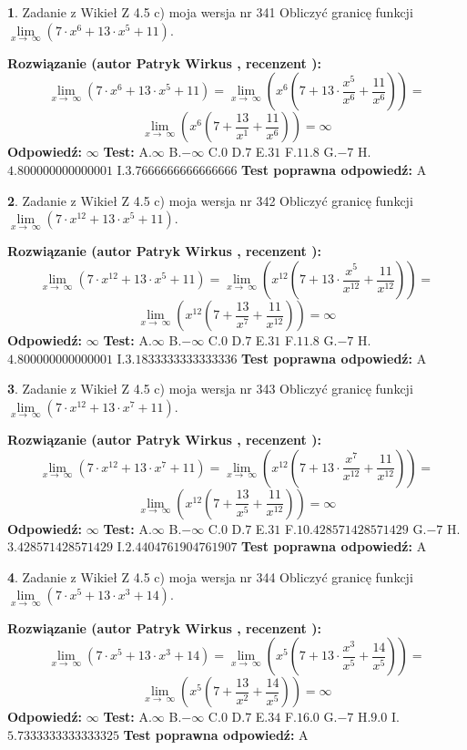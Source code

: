 \documentclass[12pt, a4paper]{article}
\theoremstyle{definition} %
\newtheorem{zad}{}
\newcommand{\zadStart}[1]{\begin{zad}#1\newline}
\newcommand{\zadStop}{\end{zad}}
\newcommand{\rozwStart}[2]{\noindent \textbf{Rozwiązanie (autor #1 , recenzent #2): }\newline}
\newcommand{\rozwStop}{\newline}
\newcommand{\odpStart}{\noindent \textbf{Odpowiedź:}\newline}
\newcommand{\odpStop}{\newline}
\newcommand{\testStart}{\noindent \textbf{Test:}\newline}
\newcommand{\testStop}{\newline}
\newcommand{\kluczStart}{\noindent \textbf{Test poprawna odpowiedź:}\newline}
\newcommand{\kluczStop}{\newline}
\begin{document}
\zadStart{Zadanie z Wikieł Z 4.5 c) moja wersja nr 341}
Obliczyć granicę funkcji  $\lim\limits_{x\to\ \infty}(7 \cdot x^{6}+13 \cdot x^{5}+11)$.
\zadStop
\rozwStart{Patryk Wirkus}{}
$$\lim\limits_{x\to\ \infty}(7 \cdot x^{6}+13 \cdot x^{5}+11) = \lim\limits_{x\to\ \infty}(x^{6}(7 +13 \cdot \frac{x^{5}}{x^{6}}+\frac{11}{x^{6}})) =$$ $$\lim\limits_{x\to\ \infty}(x^{6}(7 +\frac{13}{x^{1}}+\frac{11}{x^{6}})) =\infty$$
\rozwStop
\odpStart
$\infty$
\odpStop
\testStart
A.$\infty$ B.$-\infty$ C.$0$ D.$7$ E.$31$
F.$11.8$ G.$-7$
H.$4.800000000000001$
I.$3.7666666666666666$
\testStop
\kluczStart
A
\kluczStop



\zadStart{Zadanie z Wikieł Z 4.5 c) moja wersja nr 342}
Obliczyć granicę funkcji  $\lim\limits_{x\to\ \infty}(7 \cdot x^{12}+13 \cdot x^{5}+11)$.
\zadStop
\rozwStart{Patryk Wirkus}{}
$$\lim\limits_{x\to\ \infty}(7 \cdot x^{12}+13 \cdot x^{5}+11) = \lim\limits_{x\to\ \infty}(x^{12}(7 +13 \cdot \frac{x^{5}}{x^{12}}+\frac{11}{x^{12}})) =$$ $$\lim\limits_{x\to\ \infty}(x^{12}(7 +\frac{13}{x^{7}}+\frac{11}{x^{12}})) =\infty$$
\rozwStop
\odpStart
$\infty$
\odpStop
\testStart
A.$\infty$ B.$-\infty$ C.$0$ D.$7$ E.$31$
F.$11.8$ G.$-7$
H.$4.800000000000001$
I.$3.1833333333333336$
\testStop
\kluczStart
A
\kluczStop



\zadStart{Zadanie z Wikieł Z 4.5 c) moja wersja nr 343}
Obliczyć granicę funkcji  $\lim\limits_{x\to\ \infty}(7 \cdot x^{12}+13 \cdot x^{7}+11)$.
\zadStop
\rozwStart{Patryk Wirkus}{}
$$\lim\limits_{x\to\ \infty}(7 \cdot x^{12}+13 \cdot x^{7}+11) = \lim\limits_{x\to\ \infty}(x^{12}(7 +13 \cdot \frac{x^{7}}{x^{12}}+\frac{11}{x^{12}})) =$$ $$\lim\limits_{x\to\ \infty}(x^{12}(7 +\frac{13}{x^{5}}+\frac{11}{x^{12}})) =\infty$$
\rozwStop
\odpStart
$\infty$
\odpStop
\testStart
A.$\infty$ B.$-\infty$ C.$0$ D.$7$ E.$31$
F.$10.428571428571429$ G.$-7$
H.$3.428571428571429$
I.$2.4404761904761907$
\testStop
\kluczStart
A
\kluczStop



\zadStart{Zadanie z Wikieł Z 4.5 c) moja wersja nr 344}
Obliczyć granicę funkcji  $\lim\limits_{x\to\ \infty}(7 \cdot x^{5}+13 \cdot x^{3}+14)$.
\zadStop
\rozwStart{Patryk Wirkus}{}
$$\lim\limits_{x\to\ \infty}(7 \cdot x^{5}+13 \cdot x^{3}+14) = \lim\limits_{x\to\ \infty}(x^{5}(7 +13 \cdot \frac{x^{3}}{x^{5}}+\frac{14}{x^{5}})) =$$ $$\lim\limits_{x\to\ \infty}(x^{5}(7 +\frac{13}{x^{2}}+\frac{14}{x^{5}})) =\infty$$
\rozwStop
\odpStart
$\infty$
\odpStop
\testStart
A.$\infty$ B.$-\infty$ C.$0$ D.$7$ E.$34$
F.$16.0$ G.$-7$
H.$9.0$
I.$5.7333333333333325$
\testStop
\kluczStart
A
\kluczStop
\end{document}
